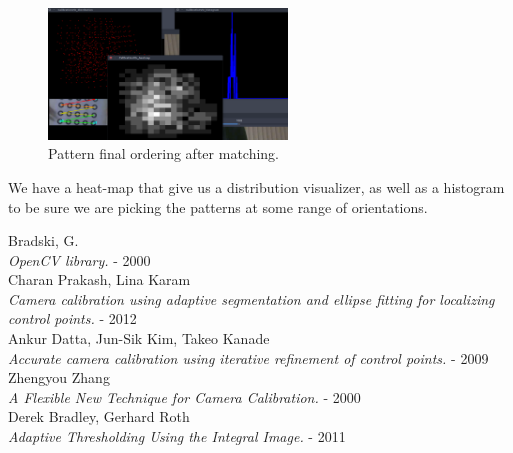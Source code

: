 \documentclass[journal]{IEEEtran}
\begin{document}
\begin{figure}[H]
\centering
\includegraphics[width=2.5in]{_img/tools.png}
\caption{Pattern final ordering after matching.}
\end{figure}

We have a heat-map that give us a distribution visualizer, as well as a histogram to be sure we are picking the patterns at some range of orientations.


\begin{thebibliography}{1}

  Bradski, G. \\
  \textit{OpenCV library.} - 2000
\\
  Charan Prakash, Lina Karam\\
  \textit{Camera calibration using adaptive segmentation and ellipse fitting for localizing control points.} - 2012
\\
  Ankur Datta, Jun-Sik Kim, Takeo Kanade\\
  \textit{Accurate camera calibration using iterative refinement of control points.} - 2009
\\
  Zhengyou Zhang \\
  \textit{A Flexible New Technique for Camera Calibration.} - 2000
\\
  Derek Bradley, Gerhard Roth \\
  \textit{Adaptive Thresholding Using the Integral Image.} - 2011

\end{thebibliography}
\end{document}
